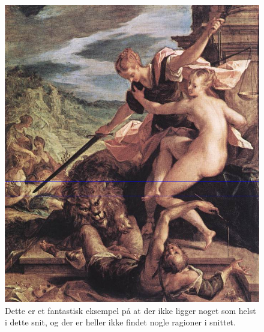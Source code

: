 \begin{figure}[h!!]
	\begin{center}
		\includegraphics[scale=0.50,angle=0]{afsnit/afprovning/billeder/BBallegory.png}
	\end{center}
	\caption[]{Dette er et fantastisk eksempel på at der ikke ligger
	           noget som helst i dette snit, og der er heller ikke
	           findet nogle ragioner i snittet.}
	\label{BBallegory}
\end{figure}

